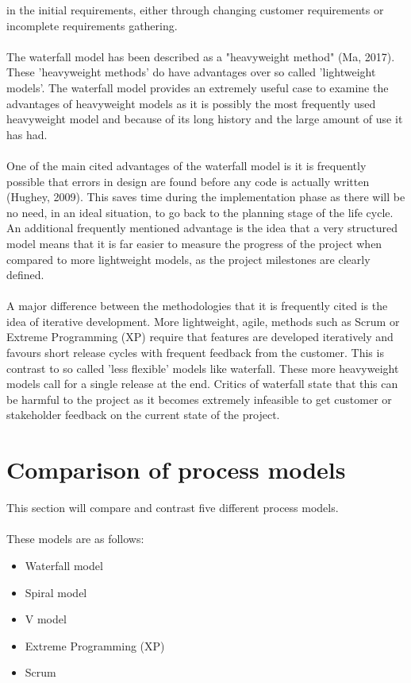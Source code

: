 \documentclass{CRPITStyle}
\begin{document}
		in the initial requirements, either through changing customer requirements or incomplete requirements gathering.\\
		~\\
		The waterfall model has been described as a "heavyweight method" (Ma, 2017). These 'heavyweight methods' 
		do have advantages over so called 'lightweight models'. The waterfall model provides an extremely useful case
		to examine the advantages of heavyweight models as it is possibly the most frequently used heavyweight model
		and because of its long history and the large amount of use it has had. \\
		~\\
		One of the main cited advantages of the waterfall model is it is frequently possible that errors in design are found
		before any code is actually written (Hughey, 2009). This saves time during the implementation phase as 
		there will be no need, in an ideal situation, to go back to the planning stage of the life cycle. An additional frequently
		mentioned advantage is the idea that a very structured model means that it is far easier to measure the progress of the project
		when compared to more lightweight models, as the project milestones are clearly defined.\\
		~\\
		A major difference between the methodologies that it is frequently cited is the idea of iterative development. More 
		lightweight, agile, methods such as Scrum or Extreme Programming (XP) require that features are developed iteratively
		and favours short release cycles with frequent feedback from the customer. This is contrast to so called 'less flexible'
		models like waterfall. These more heavyweight models call for a single release at the end. Critics of waterfall state
		that this can be harmful to the project as it becomes extremely infeasible to get customer or stakeholder feedback
		on the current state of the project. 
		
		
	\section {Comparison of process models}
	
		This section will compare and contrast five different process models.\\
		~\\
		These models are as follows:
		
		\begin{itemize}
			\item Waterfall model
			\item Spiral model
			\item V model
			\item Extreme Programming (XP)
			\item Scrum
		\end{itemize}~\\
		
\end{document}
